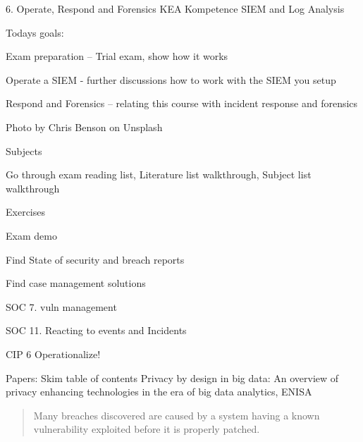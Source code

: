 \documentclass[Screen16to9,17pt]{foils}
\begin{document}
\mytitlepage
{6. Operate, Respond and Forensics}
{KEA Kompetence SIEM and Log Analysis}





Todays goals:
\begin{list2}
\item Exam preparation --  Trial exam, show how it works
\item Operate a SIEM - further discussions how to work with the SIEM you setup
\item Respond and Forensics -- relating this course with incident response and forensics
\end{list2}

 Photo by Chris Benson on Unsplash


\begin{list1}
\item Subjects
\begin{list2}
\item Go through exam reading list, Literature list walkthrough, Subject list walkthrough
\end{list2}
\item Exercises
\begin{list2}
\item Exam demo
\item Find State of security and breach reports
\item Find case management solutions
\end{list2}
\end{list1}


\begin{list1}
\item SOC 7. vuln management
\item SOC 11. Reacting to events and Incidents
\item CIP 6 Operationalize!
\item Papers: Skim table of contents Privacy by design in big data: An overview of privacy enhancing technologies in the era of big data analytics, ENISA
\item
\end{list1}




\begin{quote}
Many breaches discovered are caused by a system having a known vulnerability exploited before it is properly patched.
\end{quote}
\end{document}
